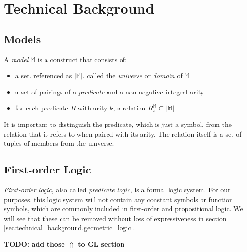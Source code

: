 \section{Technical Background}

	\subsection{Models}

		A \emph{model} $\mathbb{M}$ is a construct that consists of:
		\begin{itemize}
		\item a set, referenced as $|\mathbb{M}|$, called the \emph{universe} or \emph{domain} of $\mathbb{M}$
		\item a set of pairings of a \emph{predicate} and a non-negative integral arity
		\item for each predicate $R$ with arity $k$, a relation $R^\mathbb{M}_k \subseteq |\mathbb{M}|$
		\end{itemize}
		It is important to distinguish the predicate, which is just a symbol,
		from the relation that it refers to when paired with its arity. The
		relation itself is a set of tuples of members from the universe.

	\subsection{First-order Logic}

		\emph{First-order logic}, also called \emph{predicate logic}, is a
		formal logic system. For our purposes, this logic system will not
		contain any constant symbols or function symbols, which are commonly
		included in first-order and propositional logic. We will see that these
		can be removed without loss of expressiveness in section
		\ref{sec:technical_background.geometric_logic}.

		\textbf{TODO: add those $\Uparrow$ to GL section}

